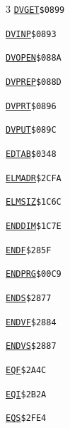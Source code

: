 \begin{multicols}{3}
\noindent\hyperlink{l:DVGET}{\texttt{DVGET}}\hfill\texttt{\$0899~\phantom{000}\llap{\pageref{l:DVGET}}}\par
\noindent\hyperlink{l:DVINP}{\texttt{DVINP}}\hfill\texttt{\$0893~\phantom{000}\llap{\pageref{l:DVINP}}}\par
\noindent\hyperlink{l:DVOPEN}{\texttt{DVOPEN}}\hfill\texttt{\$088A~\phantom{000}\llap{\pageref{l:DVOPEN}}}\par
\noindent\hyperlink{l:DVPREP}{\texttt{DVPREP}}\hfill\texttt{\$088D~\phantom{000}\llap{\pageref{l:DVPREP}}}\par
\noindent\hyperlink{l:DVPRT}{\texttt{DVPRT}}\hfill\texttt{\$0896~\phantom{000}\llap{\pageref{l:DVPRT}}}\par
\noindent\hyperlink{l:DVPUT}{\texttt{DVPUT}}\hfill\texttt{\$089C~\phantom{000}\llap{\pageref{l:DVPUT}}}\par
\noindent\hyperlink{l:EDTAB}{\texttt{EDTAB}}\hfill\texttt{\$0348~\phantom{000}\llap{\pageref{l:EDTAB}}}\par
\noindent\hyperlink{l:ELMADR}{\texttt{ELMADR}}\hfill\texttt{\$2CFA~\phantom{000}\llap{\pageref{l:ELMADR}}}\par
\noindent\hyperlink{l:ELMSIZ}{\texttt{ELMSIZ}}\hfill\texttt{\$1C6C~\phantom{000}\llap{\pageref{l:ELMSIZ}}}\par
\noindent\hyperlink{l:ENDDIM}{\texttt{ENDDIM}}\hfill\texttt{\$1C7E~\phantom{000}\llap{\pageref{l:ENDDIM}}}\par
\noindent\hyperlink{l:ENDF}{\texttt{ENDF}}\hfill\texttt{\$285F~\phantom{000}\llap{\pageref{l:ENDF}}}\par
\noindent\hyperlink{l:ENDPRG}{\texttt{ENDPRG}}\hfill\texttt{\$00C9~\phantom{000}\llap{\pageref{l:ENDPRG}}}\par
\noindent\hyperlink{l:ENDS}{\texttt{ENDS}}\hfill\texttt{\$2877~\phantom{000}\llap{\pageref{l:ENDS}}}\par
\noindent\hyperlink{l:ENDVF}{\texttt{ENDVF}}\hfill\texttt{\$2884~\phantom{000}\llap{\pageref{l:ENDVF}}}\par
\noindent\hyperlink{l:ENDVS}{\texttt{ENDVS}}\hfill\texttt{\$2887~\phantom{000}\llap{\pageref{l:ENDVS}}}\par
\noindent\hyperlink{l:EQF}{\texttt{EQF}}\hfill\texttt{\$2A4C~\phantom{000}\llap{\pageref{l:EQF}}}\par
\noindent\hyperlink{l:EQI}{\texttt{EQI}}\hfill\texttt{\$2B2A~\phantom{000}\llap{\pageref{l:EQI}}}\par
\noindent\hyperlink{l:EQS}{\texttt{EQS}}\hfill\texttt{\$2FE4~\phantom{000}\llap{\pageref{l:EQS}}}\par

\end{multicols}
